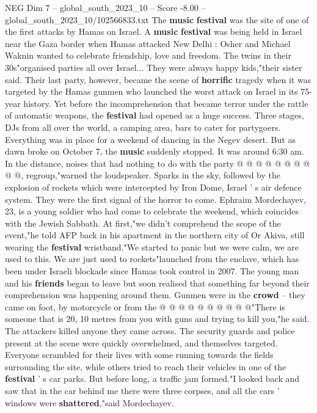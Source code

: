\begin{textsample}{NEG Dim 7 – global\_south\_2023\_10 – Score -8.00 – global\_south\_2023\_10/102566833.txt}  \label{ex:f7_neg_317}
The \textbf{music} \textbf{festival} was the site of one of the first attacks by Hamas on Israel.
A \textbf{music} \textbf{festival} was being held in Israel near the Gaza border when Hamas attacked New Delhi : Osher and Michael Waknin wanted to celebrate friendship, love and freedom.
The twins in their 30s"organised parties all over Israel...
They were always happy kids,"their sister said.
Their last party, however, became the scene of \textbf{horrific} tragedy when it was targeted by the Hamas gunmen who launched the worst attack on Israel in its 75-year history.
Yet before the incomprehension that became terror under the rattle of automatic weapons, the \textbf{festival} had opened as a huge success.
Three stages, DJs from all over the world, a camping area, bars to cater for partygoers.
Everything was in place for a weekend of dancing in the Negev desert.
But as dawn broke on October 7, the \textbf{music} suddenly stopped.
It was around 6:30 am.
In the distance, noises that had nothing to do with the party @ @ @ @ @ @ @ @ @ @, regroup,"warned the loudspeaker.
Sparks in the sky, followed by the explosion of rockets which were intercepted by Iron Dome, Israel ' s air defence system.
They were the first signal of the horror to come.
Ephraim Mordechayev, 23, is a young soldier who had come to celebrate the weekend, which coincides with the Jewish Sabbath.
At first,"we didn't comprehend the scope of the event,"he told AFP back in his apartment in the northern city of Or Akiva, still wearing the \textbf{festival} wristband."We started to panic but we were calm, we are used to this.
We are just used to rockets"launched from the enclave, which has been under Israeli blockade since Hamas took control in 2007.
The young man and his \textbf{friends} began to leave but soon realised that something far beyond their comprehension was happening around them.
Gunmen were in the \textbf{crowd} -- they came on foot, by motorcycle or from the @ @ @ @ @ @ @ @ @ @"There is someone that is 20, 10 metres from you with guns and trying to kill you,"he said.
The attackers killed anyone they came across.
The security guards and police present at the scene were quickly overwhelmed, and themselves targeted.
Everyone scrambled for their lives with some running towards the fields surrounding the site, while others tried to reach their vehicles in one of the \textbf{festival} ' s car parks.
But before long, a traffic jam formed."I looked back and saw that in the car behind me there were three corpses, and all the cars ' windows were \textbf{shattered},"said Mordechayev.

\end{textsample}
